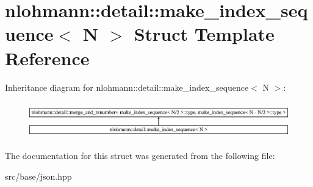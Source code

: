 \hypertarget{structnlohmann_1_1detail_1_1make__index__sequence}{}\section{nlohmann\+:\+:detail\+:\+:make\+\_\+index\+\_\+sequence$<$ N $>$ Struct Template Reference}
\label{structnlohmann_1_1detail_1_1make__index__sequence}
Inheritance diagram for nlohmann\+:\+:detail\+:\+:make\+\_\+index\+\_\+sequence$<$ N $>$\+:\begin{figure}[H]
\begin{center}
\leavevmode
\includegraphics[height=1.597718cm]{structnlohmann_1_1detail_1_1make__index__sequence}
\end{center}
\end{figure}


The documentation for this struct was generated from the following file\+:\begin{DoxyCompactItemize}
\item 
src/base/json.\+hpp\end{DoxyCompactItemize}
